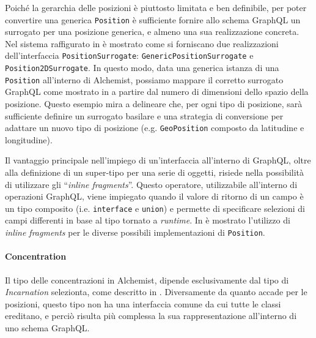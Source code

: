 Poiché la gerarchia delle posizioni è piuttosto limitata e ben definibile, per poter convertire una generica \texttt{Position} è sufficiente fornire
allo schema GraphQL un surrogato per una posizione generica, e almeno una sua realizzazione concreta. Nel sistema raffigurato in 
è mostrato come si forniscano due realizzazioni dell'interfaccia \texttt{PositionSurrogate}: \texttt{GenericPositionSurrogate} e \texttt{Position2DSurrogate}.
%
%
In questo modo, data una generica istanza di una \texttt{Position} all'interno di Alchemist, possiamo mappare il corretto surrogato GraphQL come mostrato in 
a partire dal numero di dimensioni dello spazio della posizione. Questo esempio mira a delineare che, per ogni tipo di posizione, sarà sufficiente
definire un surrogato basilare e una strategia di conversione per adattare un nuovo tipo di posizione (e.g. \texttt{GeoPosition} composto
da latitudine e longitudine).

Il vantaggio principale nell'impiego di un'interfaccia all'interno di GraphQL, oltre alla definizione di un super-tipo per una serie di oggetti,
risiede nella possibilità di utilizzare gli ``\textit{inline fragments}''. Questo operatore, utilizzabile all'interno di operazioni GraphQL, viene impiegato
quando il valore di ritorno di un campo è un tipo composito (i.e. \texttt{interface} e \texttt{union}) e permette di specificare selezioni di campi differenti
in base al tipo tornato a \textit{runtime}. In  è mostrato l'utilizzo di \textit{inline fragments} per le diverse possibili implementazioni
di \texttt{Position}.


\paragraph{Concentration}
Il tipo delle concentrazioni in Alchemist, dipende esclusivamente dal tipo di \textit{Incarnation} selezionta, come descritto in .
Diversamente da quanto accade per le posizioni, questo tipo non ha una interfaccia comune da cui tutte le classi ereditano, e perciò risulta più complessa
la sua rappresentazione all'interno di uno schema GraphQL.

